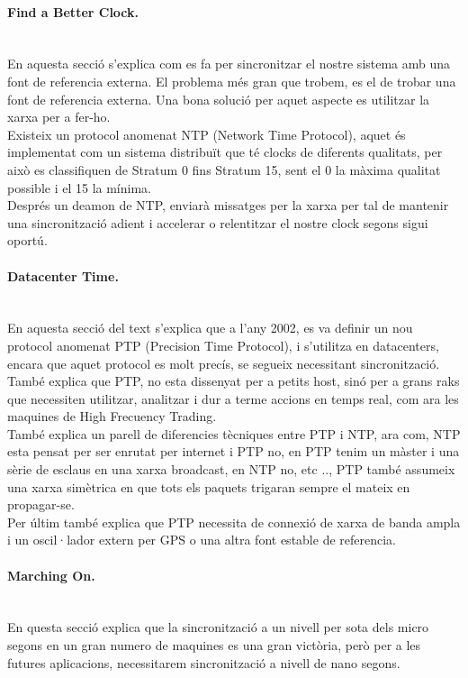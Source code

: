\documentclass[a4paper, 10pt]{article}
\begin{document}
\paragraph{Find a Better Clock.\\}
\hspace{-0,55cm}\\ En aquesta secció s'explica com es fa per sincronitzar el nostre sistema amb una font de referencia externa. El problema més gran que trobem, es el de trobar una font de referencia externa. Una bona solució per aquet aspecte es utilitzar la xarxa per a fer-ho.\\
Existeix un protocol anomenat NTP (Network Time Protocol), aquet és implementat com un sistema distribuït que té clocks de diferents qualitats, per això es classifiquen de Stratum 0 fins Stratum 15, sent el 0 la màxima qualitat possible i el 15 la mínima.
\\Després un deamon de NTP, enviarà missatges per la xarxa per tal de mantenir una sincronització adient i accelerar o relentitzar el nostre clock segons sigui oportú.

\paragraph{Datacenter Time.\\}
\hspace{-0,55cm}\\ En aquesta secció del text s'explica que a l'any 2002, es va definir un nou protocol anomenat PTP (Precision Time Protocol), i s'utilitza en datacenters, encara que aquet protocol es molt precís, se segueix necessitant sincronització. També explica que PTP, no esta dissenyat per a petits host, sinó per a grans raks que necessiten utilitzar, analitzar i dur a terme accions en temps real, com ara les maquines de High Frecuency Trading.\\
També explica un parell de diferencies tècniques entre PTP i NTP, ara com, NTP esta pensat per ser enrutat per internet i PTP no, en PTP tenim un màster i una sèrie de esclaus en una xarxa broadcast, en NTP no, etc .., PTP també assumeix una xarxa simètrica en que tots els paquets trigaran sempre el mateix en propagar-se.\\
Per últim també explica que PTP necessita de connexió de xarxa de banda ampla i un oscil·lador extern per GPS o una altra font estable de referencia.

\paragraph{ Marching On.\\}
\hspace{-0,55cm}\\ En questa secció explica que la sincronització a un nivell per sota dels micro segons en un gran numero de maquines es una gran victòria, però per a les futures aplicacions, necessitarem sincronització a nivell de nano segons.
\end{document}
